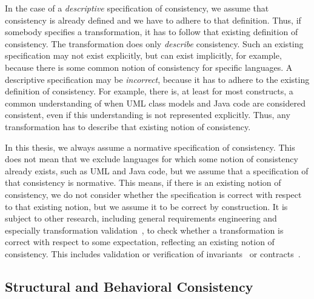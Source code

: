 In the case of a \emph{descriptive} specification of consistency, we assume that consistency is already defined and we have to adhere to that definition.
Thus, if somebody specifies a transformation, it has to follow that existing definition of consistency. 
The transformation does only \emph{describe} consistency.
Such an existing specification may not exist explicitly, but can exist implicitly, for example, because there is some common notion of consistency for specific languages.
A descriptive specification may be \emph{incorrect}, because it has to adhere to the existing definition of consistency.
For example, there is, at least for most constructs, a common understanding of when \gls{UML} class models and Java code are considered consistent, even if this understanding is not represented explicitly.
Thus, any transformation has to describe that existing notion of consistency.

In this thesis, we always assume a normative specification of consistency.
This does not mean that we exclude languages for which some notion of consistency already exists, such as \gls{UML} and Java code, but we assume that a specification of that consistency is normative.
This means, if there is an existing notion of consistency, we do not consider whether the specification is correct with respect to that existing notion, but we assume it to be correct by construction.
It is subject to other research, including general requirements engineering and especially transformation validation~\cite{rahim2015SurveyTransformationVerification-SoSym}, to check whether a transformation is correct with respect to some expectation, reflecting an existing notion of consistency.
This includes validation or verification of invariants~\cite{cabot2010VerificationInvariants-JSS} or contracts~\cite{azizi2017ContractVerification-ICCKE, vallecillo2012FormalTesting-FMMDE}.


\subsection{Structural and Behavioral Consistency}
\label{chap:networks:notions:types}

